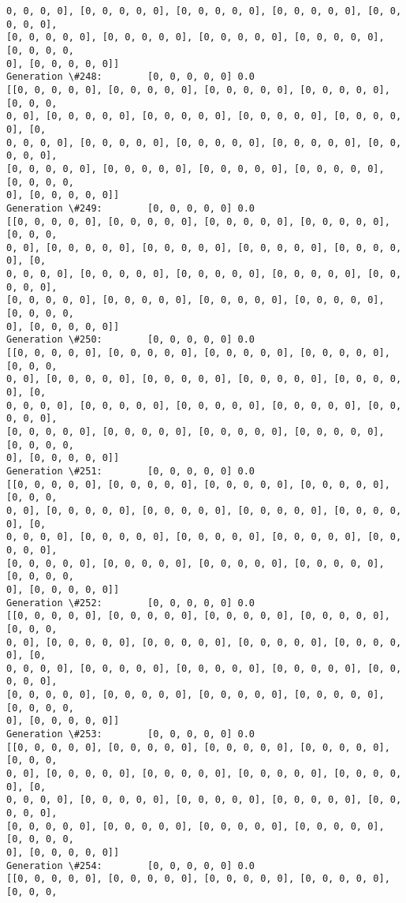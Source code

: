 \documentclass[11pt]{article}
\begin{document}
\begin{Verbatim}[commandchars=\\\{\}]
0, 0, 0, 0], [0, 0, 0, 0, 0], [0, 0, 0, 0, 0], [0, 0, 0, 0, 0], [0, 0, 0, 0, 0],
[0, 0, 0, 0, 0], [0, 0, 0, 0, 0], [0, 0, 0, 0, 0], [0, 0, 0, 0, 0], [0, 0, 0, 0,
0], [0, 0, 0, 0, 0]]
Generation \#248:        [0, 0, 0, 0, 0] 0.0
[[0, 0, 0, 0, 0], [0, 0, 0, 0, 0], [0, 0, 0, 0, 0], [0, 0, 0, 0, 0], [0, 0, 0,
0, 0], [0, 0, 0, 0, 0], [0, 0, 0, 0, 0], [0, 0, 0, 0, 0], [0, 0, 0, 0, 0], [0,
0, 0, 0, 0], [0, 0, 0, 0, 0], [0, 0, 0, 0, 0], [0, 0, 0, 0, 0], [0, 0, 0, 0, 0],
[0, 0, 0, 0, 0], [0, 0, 0, 0, 0], [0, 0, 0, 0, 0], [0, 0, 0, 0, 0], [0, 0, 0, 0,
0], [0, 0, 0, 0, 0]]
Generation \#249:        [0, 0, 0, 0, 0] 0.0
[[0, 0, 0, 0, 0], [0, 0, 0, 0, 0], [0, 0, 0, 0, 0], [0, 0, 0, 0, 0], [0, 0, 0,
0, 0], [0, 0, 0, 0, 0], [0, 0, 0, 0, 0], [0, 0, 0, 0, 0], [0, 0, 0, 0, 0], [0,
0, 0, 0, 0], [0, 0, 0, 0, 0], [0, 0, 0, 0, 0], [0, 0, 0, 0, 0], [0, 0, 0, 0, 0],
[0, 0, 0, 0, 0], [0, 0, 0, 0, 0], [0, 0, 0, 0, 0], [0, 0, 0, 0, 0], [0, 0, 0, 0,
0], [0, 0, 0, 0, 0]]
Generation \#250:        [0, 0, 0, 0, 0] 0.0
[[0, 0, 0, 0, 0], [0, 0, 0, 0, 0], [0, 0, 0, 0, 0], [0, 0, 0, 0, 0], [0, 0, 0,
0, 0], [0, 0, 0, 0, 0], [0, 0, 0, 0, 0], [0, 0, 0, 0, 0], [0, 0, 0, 0, 0], [0,
0, 0, 0, 0], [0, 0, 0, 0, 0], [0, 0, 0, 0, 0], [0, 0, 0, 0, 0], [0, 0, 0, 0, 0],
[0, 0, 0, 0, 0], [0, 0, 0, 0, 0], [0, 0, 0, 0, 0], [0, 0, 0, 0, 0], [0, 0, 0, 0,
0], [0, 0, 0, 0, 0]]
Generation \#251:        [0, 0, 0, 0, 0] 0.0
[[0, 0, 0, 0, 0], [0, 0, 0, 0, 0], [0, 0, 0, 0, 0], [0, 0, 0, 0, 0], [0, 0, 0,
0, 0], [0, 0, 0, 0, 0], [0, 0, 0, 0, 0], [0, 0, 0, 0, 0], [0, 0, 0, 0, 0], [0,
0, 0, 0, 0], [0, 0, 0, 0, 0], [0, 0, 0, 0, 0], [0, 0, 0, 0, 0], [0, 0, 0, 0, 0],
[0, 0, 0, 0, 0], [0, 0, 0, 0, 0], [0, 0, 0, 0, 0], [0, 0, 0, 0, 0], [0, 0, 0, 0,
0], [0, 0, 0, 0, 0]]
Generation \#252:        [0, 0, 0, 0, 0] 0.0
[[0, 0, 0, 0, 0], [0, 0, 0, 0, 0], [0, 0, 0, 0, 0], [0, 0, 0, 0, 0], [0, 0, 0,
0, 0], [0, 0, 0, 0, 0], [0, 0, 0, 0, 0], [0, 0, 0, 0, 0], [0, 0, 0, 0, 0], [0,
0, 0, 0, 0], [0, 0, 0, 0, 0], [0, 0, 0, 0, 0], [0, 0, 0, 0, 0], [0, 0, 0, 0, 0],
[0, 0, 0, 0, 0], [0, 0, 0, 0, 0], [0, 0, 0, 0, 0], [0, 0, 0, 0, 0], [0, 0, 0, 0,
0], [0, 0, 0, 0, 0]]
Generation \#253:        [0, 0, 0, 0, 0] 0.0
[[0, 0, 0, 0, 0], [0, 0, 0, 0, 0], [0, 0, 0, 0, 0], [0, 0, 0, 0, 0], [0, 0, 0,
0, 0], [0, 0, 0, 0, 0], [0, 0, 0, 0, 0], [0, 0, 0, 0, 0], [0, 0, 0, 0, 0], [0,
0, 0, 0, 0], [0, 0, 0, 0, 0], [0, 0, 0, 0, 0], [0, 0, 0, 0, 0], [0, 0, 0, 0, 0],
[0, 0, 0, 0, 0], [0, 0, 0, 0, 0], [0, 0, 0, 0, 0], [0, 0, 0, 0, 0], [0, 0, 0, 0,
0], [0, 0, 0, 0, 0]]
Generation \#254:        [0, 0, 0, 0, 0] 0.0
[[0, 0, 0, 0, 0], [0, 0, 0, 0, 0], [0, 0, 0, 0, 0], [0, 0, 0, 0, 0], [0, 0, 0,

\end{Verbatim}
\end{document}
